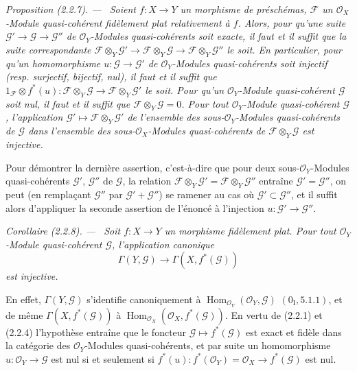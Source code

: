 \documentclass[10pt,oneside]{book}
\newenvironment{proposition}[1][]{%
  \par\medskip\noindent\itshape Proposition (#1). ---\ }{\par}
\newenvironment{corollary}[1][]{%
  \par\medskip\noindent\itshape Corollaire (#1). ---\ }{\par}
\begin{document}
\begin{proposition}[2.2.7]
\label{IV.2.2.7-fr}
Soient $f:X\to Y$ un morphisme de préschémas, $\mathscr F$ un
$\mathcal O_X$-Module quasi-cohérent fidèlement plat relativement à $f$.
Alors, pour qu'une suite $\mathscr G'\to\mathscr G\to\mathscr G''$ de
$\mathcal O_Y$-Modules quasi-cohérents soit exacte, il faut et il suffit que
la suite correspondante
$\mathscr F\otimes_Y\mathscr G'\to\mathscr F\otimes_Y\mathscr G
\to\mathscr F\otimes_Y\mathscr G''$ le soit. En particulier, pour qu'un
homomorphisme $u:\mathscr G\to\mathscr G'$ de $\mathcal O_Y$-Modules
quasi-cohérents soit injectif (resp. surjectif, bijectif, nul), il faut et il
suffit que $1_{\mathscr F}\otimes f^*(u):
\mathscr F\otimes_Y\mathscr G\to\mathscr F\otimes_Y\mathscr G'$ le soit.
Pour qu'un $\mathcal O_Y$-Module quasi-cohérent $\mathscr G$ soit nul, il faut
et il suffit que $\mathscr F\otimes_Y\mathscr G=0$. Pour tout
$\mathcal O_Y$-Module quasi-cohérent $\mathscr G$, l'application
$\mathscr G'\mapsto\mathscr F\otimes_Y\mathscr G'$ de l'ensemble des
sous-$\mathcal O_Y$-Modules quasi-cohérents de $\mathscr G$ dans l'ensemble
des sous-$\mathcal O_X$-Modules quasi-cohérents de
$\mathscr F\otimes_Y\mathscr G$ est injective.
\end{proposition}

Pour démontrer la dernière assertion, c'est-à-dire que pour deux
sous-$\mathcal O_Y$-Modules quasi-cohérents $\mathscr G'$, $\mathscr G''$ de
$\mathscr G$, la relation
$\mathscr F\otimes_Y\mathscr G'=\mathscr F\otimes_Y\mathscr G''$ entraîne
$\mathscr G'=\mathscr G''$, on peut (en remplaçant $\mathscr G''$ par
$\mathscr G'+\mathscr G''$) se ramener au cas où
$\mathscr G'\subset\mathscr G''$, et il suffit alors d'appliquer la seconde
assertion de l'énoncé à l'injection $u:\mathscr G'\to\mathscr G''$.

\begin{corollary}[2.2.8]
\label{IV.2.2.8-fr}
Soit $f:X\to Y$ un morphisme fidèlement plat. Pour tout
$\mathcal O_Y$-Module quasi-cohérent $\mathscr G$, l'application canonique
\begin{equation}
\tag{2.2.8.1}
\label{IV.2.2.8.1-fr}
\Gamma(Y,\mathscr G)\longrightarrow\Gamma(X,f^*(\mathscr G))
\end{equation}
est injective.
\end{corollary}

En effet, $\Gamma(Y,\mathscr G)$ s'identifie canoniquement à
$\operatorname{Hom}_{\mathcal O_Y}(\mathcal O_Y,\mathscr G)$
$(0_{\mathrm I},5.1.1)$, et de même $\Gamma(X,f^*(\mathscr G))$ à
$\operatorname{Hom}_{\mathcal O_X}(\mathcal O_X,f^*(\mathscr G))$. En vertu
de (2.2.1) et (2.2.4) l'hypothèse entraîne que le foncteur
$\mathscr G\mapsto f^*(\mathscr G)$ est exact et fidèle dans la catégorie des
$\mathcal O_Y$-Modules quasi-cohérents, et par suite un homomorphisme
$u:\mathcal O_Y\to\mathscr G$ est nul si et seulement si
$f^*(u):f^*(\mathcal O_Y)=\mathcal O_X\to f^*(\mathscr G)$ est nul.
\end{document}

